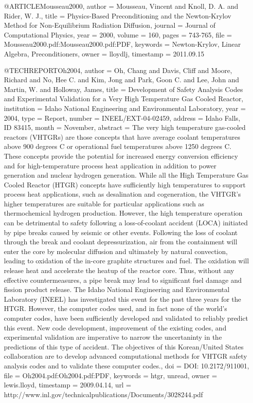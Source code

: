 {@ARTICLE{Mousseau2000,
  author = {Mousseau, Vincent and Knoll, D. A. and Rider, W. J.},
  title = {Physics-Based Preconditioning and the Newton-Krylov Method for Non-Equilibrium
	Radiation Diffusion},
  journal = {Journal of Computational Physics},
  year = {2000},
  volume = {160},
  pages = {743-765},
  file = {Mousseau2000.pdf:Mousseau2000.pdf:PDF},
  keywords = {Newton-Krylov, Linear Algebra, Preconditioners},
  owner = {lloydlj},
  timestamp = {2011.09.15}
}

@TECHREPORT{Oh2004,
  author = {Oh, Chang and Davis, Cliff and Moore, Richard and No, Hee C. and
	Kim, Jong and Park, Goon C. and Lee, John and Martin, W. and Holloway,
	James},
  title = {Development of Safety Analysis Codes and Experimental Validation
	for a Very High Temperature Gas Cooled Reactor},
  institution = {Idaho National Engineering and Environmental Laboratory},
  year = {2004},
  type = {Report},
  number = {INEEL/EXT-04-02459},
  address = {Idaho Falls, ID 83415},
  month = {November},
  abstract = {The very high temperature gas-cooled reactors (VHTGRs) are those concepts
	that have average coolant temperatures above 900 degrees C or operational
	fuel temperatures above 1250 degrees C. These concepts provide the
	potential for increased energy conversion efficiency and for high-temperature
	process heat application in addition to power generation and nuclear
	hydrogen generation. While all the High Temperature Gas Cooled Reactor
	(HTGR) concepts have sufficiently high temperatures to support process
	heat applications, such as desalination and cogeneration, the VHTGR's
	higher temperatures are suitable for particular applications such
	as thermochemical hydrogen production. However, the high temperature
	operation can be detrimental to safety following a loss-of-coolant
	accident (LOCA) initiated by pipe breaks caused by seismic or other
	events. Following the loss of coolant through the break and coolant
	depressurization, air from the containment will enter the core by
	molecular diffusion and ultimately by natural convection, leading
	to oxidation of the in-core graphite structures and fuel. The oxidation
	will release heat and accelerate the heatup of the reactor core.
	Thus, without any effective countermeasures, a pipe break may lead
	to significant fuel damage and fission product release. The Idaho
	National Engineering and Environmental Laboratory (INEEL) has investigated
	this event for the past three years for the HTGR. However, the computer
	codes used, and in fact none of the world's computer codes, have
	been sufficiently developed and validated to reliably predict this
	event. New code development, improvement of the existing codes, and
	experimental validation are imperative to narrow the uncertaninty
	in the predictions of this type of accident. The objectives of this
	Korean/United States collaboration are to develop advanced computational
	methods for VHTGR safety analysis codes and to validate these computer
	codes.},
  doi = {DOI: 10.2172/911001},
  file = {Oh2004.pdf:Oh2004.pdf:PDF},
  keywords = {htgr, unread},
  owner = {lewis.lloyd},
  timestamp = {2009.04.14},
  url = {http://www.inl.gov/technicalpublications/Documents/3028244.pdf}
}

}

